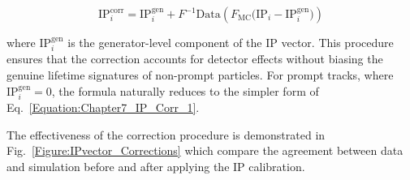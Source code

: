 \begin{equation}
\mathrm{IP}_i^{\mathrm{corr}} = \mathrm{IP}_i^{\mathrm{gen}} + F^{-1}{\mathrm{Data}}\left( F_{\mathrm{MC}}\big(\mathrm{IP}_i - \mathrm{IP}_i^{\mathrm{gen}}\big) \right)
\end{equation}

where $\mathrm{IP}_i^{\mathrm{gen}}$ is the generator-level component of the \ac{IP} vector.
This procedure ensures that the correction accounts for detector effects without biasing the genuine lifetime signatures of non-prompt particles. For prompt tracks, where $\mathrm{IP}_i^{\mathrm{gen}}=0$, the formula naturally reduces to the simpler form of Eq.~\ref{Equation:Chapter7_IP_Corr_1}. 

The effectiveness of the correction procedure is demonstrated in Fig.~\ref{Figure:IPvector_Corrections} which compare the agreement between data and simulation before and after applying the \ac{IP} calibration.

